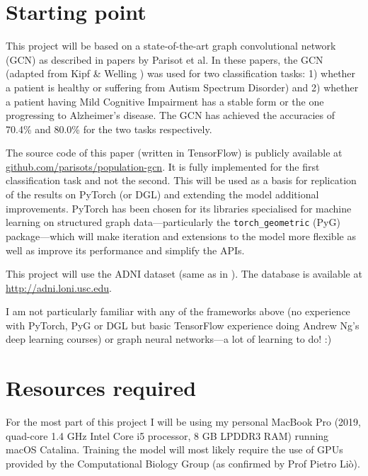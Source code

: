 \documentclass[12pt,a4paper,twoside]{article}
\begin{document}
\section*{Starting point}


This project will be based on a state-of-the-art graph convolutional network (GCN) as described in papers by Parisot et al. \cite{parisot2017spectral, parisot2018disease} In these papers, the GCN (adapted from Kipf \& Welling \cite{kipf2017semi}) was used for two classification tasks: 1) whether a patient is  healthy or suffering from Autism Spectrum Disorder) and 2) whether a patient having Mild Cognitive Impairment has a stable form or the one progressing to Alzheimer's disease. The GCN has achieved the accuracies of 70.4\% and 80.0\% for the two tasks respectively. 

The source code of this paper (written in TensorFlow) is publicly available at \url{github.com/parisots/population-gcn}. It is fully implemented for the first classification task and not the second. This will be used as a basis for replication of the results on PyTorch (or DGL) and extending the model additional improvements. PyTorch has been chosen for its libraries specialised for machine learning on structured graph data—particularly the \texttt{torch\_geometric} (PyG) package—which will make iteration and extensions to the model more flexible as well as improve its performance and simplify the APIs.

This project will use the ADNI dataset (same as in \cite{parisot2017spectral,parisot2018disease}). The database is available at \url{http://adni.loni.usc.edu}.

I am not particularly familiar with any of the frameworks above (no experience with PyTorch, PyG or DGL but basic TensorFlow experience doing Andrew Ng's deep learning courses) or graph neural networks—a lot of learning to do! :)

\section*{Resources required}

For the most part of this project I will be using my personal MacBook Pro (2019, quad-core 1.4 GHz Intel Core i5 processor, 8 GB LPDDR3 RAM) running macOS Catalina. Training the model will most likely require the use of GPUs provided by the Computational Biology Group (as confirmed by Prof Pietro Liò).
\end{document}
